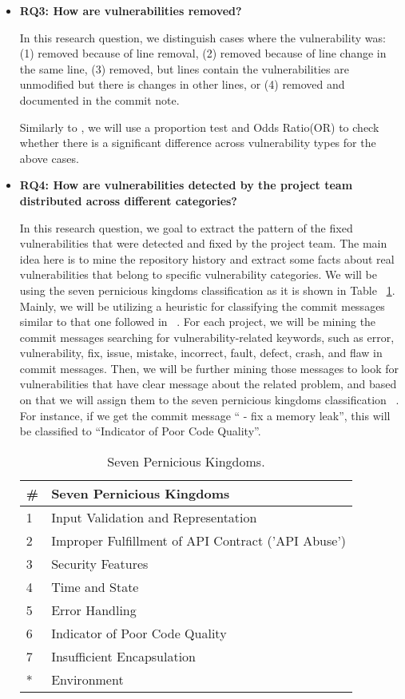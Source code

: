 \begin{itemize}
\item \textbf{RQ3: How are vulnerabilities removed?}

In this research question, we distinguish cases where the vulnerability was:
(1) removed because of line removal, 
(2) removed because of line change in the same line, 
(3) removed, but lines contain the vulnerabilities are unmodified 
but there is changes in other lines, 
or (4) removed and documented in the commit note.

Similarly to \cite{di2009life}, 
we will use a proportion test and Odds Ratio(OR) 
to check whether there is a significant difference
across vulnerability types for the above cases. 


\item \textbf{RQ4: How are vulnerabilities detected 
by the project team distributed across different categories?}

In this research question,
we goal to extract the pattern of the fixed vulnerabilities
that were detected and fixed by the project team. 
The main idea here is to mine the repository history
and extract some facts about real vulnerabilities
that belong to specific vulnerability categories.
We will be using the seven pernicious kingdoms classification \cite{tsipenyuk2005seven}
as it is shown in Table ~\ref{Seven}.  
Mainly, we will be utilizing a heuristic for classifying the commit messages
similar to that one followed in ~\cite{mockus2000identifying}.
For each project, we will be mining the commit messages
searching for vulnerability-related keywords,
such as  error,  vulnerability,  fix,  issue, mistake, incorrect,
fault, defect, crash, and flaw in commit messages. 
Then, we will be further mining those messages to look for vulnerabilities
that have clear message about the related problem, 
and based on that we will assign them to the seven pernicious kingdoms classification ~\cite{tsipenyuk2005seven}. 
For instance, if we get the commit message `` - fix a memory leak'',
this will be classified to ``Indicator of Poor Code Quality''.  

\begin{table}[ht]
\centering
\scriptsize
\caption{Seven Pernicious Kingdoms.}
\label{Seven}
\begin{tabular}{||p{.5cm}|p{6cm} ||}
\hline
\textbf{\#} & \textbf{Seven Pernicious Kingdoms
} \\
\hline\hline
1& Input Validation and Representation  \\
2& Improper Fulfillment of API Contract ('API Abuse')  \\
3& Security Features  \\
4& Time and State  \\
5& Error Handling  \\
6& Indicator of Poor Code Quality  \\
7& Insufficient Encapsulation  \\
* & Environment  \\
\hline
\end{tabular}
\end{table}



\end{itemize}
